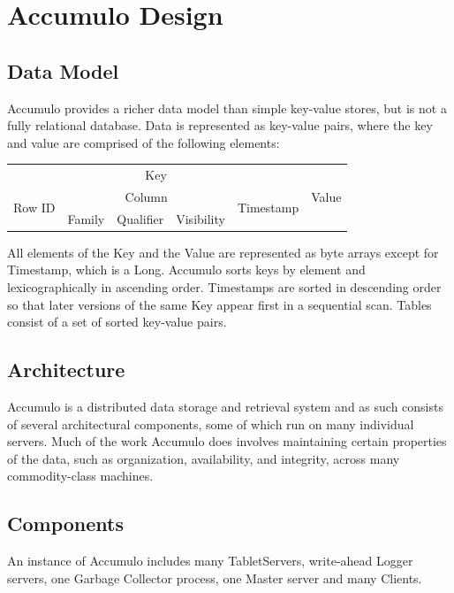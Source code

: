 \chapter{Accumulo Design}

\section{Data Model}

Accumulo provides a richer data model than simple key-value stores, but is not a
fully relational database. Data is represented as key-value pairs, where the key and
value are comprised of the following elements:

\begin{center}
\begin{tabular}{|c|c|c|c|c|c|} \hline
\multicolumn{5}{|c|}{Key} & \multirow{3}{*}{Value}\\ \cline{1-5}
\multirow{2}{*}{Row ID}& \multicolumn{3}{|c|}{Column} & \multirow{2}{*}{Timestamp} & \\ \cline{2-4}
& Family & Qualifier & Visibility & & \\ \hline
\end{tabular}
\end{center}

All elements of the Key and the Value are represented as byte arrays except for
Timestamp, which is a Long. Accumulo sorts keys by element and lexicographically
in ascending order. Timestamps are sorted in descending order so that later
versions of the same Key appear first in a sequential scan. Tables consist of a set of
sorted key-value pairs.

\section{Architecture}

Accumulo is a distributed data storage and retrieval system and as such consists of
several architectural components, some of which run on many individual servers.
Much of the work Accumulo does involves maintaining certain properties of the
data, such as organization, availability, and integrity, across many commodity-class
machines.

\section{Components}

An instance of Accumulo includes many TabletServers, write-ahead Logger
servers, one Garbage Collector process, one Master server and many Clients.

